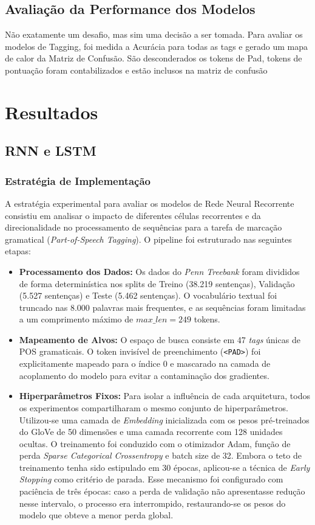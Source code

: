 \documentclass[a4paper,12pt]{article}
\begin{document}
\subsection{Avaliação da Performance dos Modelos}
Não exatamente um desafio, mas sim uma decisão a ser tomada. Para avaliar os modelos de Tagging, foi medida a Acurácia para todas as tags e gerado um mapa de calor da Matriz de Confusão. São desconderados os tokens de Pad, tokens de pontuação foram contabilizados e estão inclusos na matriz de confusão

\section{Resultados}

\subsection{RNN e LSTM}

\subsubsection{Estratégia de Implementação}
A estratégia experimental para avaliar os modelos de Rede Neural Recorrente consistiu em analisar o impacto de diferentes células recorrentes e da direcionalidade no processamento de sequências para a tarefa de marcação gramatical (\textit{Part-of-Speech Tagging}). O pipeline foi estruturado nas seguintes etapas:

\begin{itemize}
    \item \textbf{Processamento dos Dados:} Os dados do \textit{Penn Treebank} foram divididos de forma determinística nos splits de Treino (38.219 sentenças), Validação (5.527 sentenças) e Teste (5.462 sentenças). O vocabulário textual foi truncado nas 8.000 palavras mais frequentes, e as sequências foram limitadas a um comprimento máximo de $max\_len = 249$ tokens. 
    \item \textbf{Mapeamento de Alvos:} O espaço de busca consiste em 47 \textit{tags} únicas de POS gramaticais. O token invisível de preenchimento (\texttt{<PAD>}) foi explicitamente mapeado para o índice 0 e mascarado na camada de acoplamento do modelo para evitar a contaminação dos gradientes.
    \item \textbf{Hiperparâmetros Fixos:}  Para isolar a influência de cada arquitetura, todos os experimentos compartilharam o mesmo conjunto de hiperparâmetros. Utilizou-se uma camada de \textit{Embedding} inicializada com os pesos pré-treinados do GloVe de 50 dimensões e uma camada recorrente com 128 unidades ocultas. O treinamento foi conduzido com o otimizador Adam, função de perda \textit{Sparse Categorical Crossentropy} e batch size de 32. Embora o teto de treinamento tenha sido estipulado em 30 épocas, aplicou-se a técnica de \textit{Early Stopping} como critério de parada. Esse mecanismo foi configurado com paciência de três épocas: caso a perda de validação não apresentasse redução nesse intervalo, o processo era interrompido, restaurando-se os pesos do modelo que obteve a menor perda global.
\end{itemize}
\end{document}

